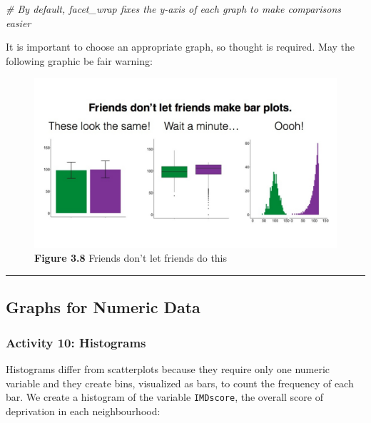 \documentclass[
]{book}
\newenvironment{Shaded}{\begin{snugshade}}{\end{snugshade}}
\newcommand{\CommentTok}[1]{\textcolor[rgb]{0.56,0.35,0.01}{\textit{#1}}}
\begin{document}
\begin{Shaded}
\begin{Highlighting}[]
\CommentTok{\# By default, facet\_wrap fixes the y{-}axis of each graph to make comparisons easier}
\end{Highlighting}
\end{Shaded}

It is important to choose an appropriate graph, so thought is required. May the following graphic be fair warning:

\begin{figure}
\centering
\includegraphics{Images/barplots.jpg}
\caption{\textbf{Figure 3.8} Friends don't let friends do this}
\end{figure}

\begin{center}\rule{0.5\linewidth}{0.5pt}\end{center}

\hypertarget{graphs-for-numeric-data}{%
\subsection{Graphs for Numeric Data}\label{graphs-for-numeric-data}}

\hypertarget{activity-10-histograms}{%
\subsubsection{Activity 10: Histograms}\label{activity-10-histograms}}

Histograms differ from scatterplots because they require only one numeric variable and they create bins, visualized as bars, to count the frequency of each bar. We create a histogram of the variable \texttt{IMDscore}, the overall score of deprivation in each neighbourhood:
\end{document}
